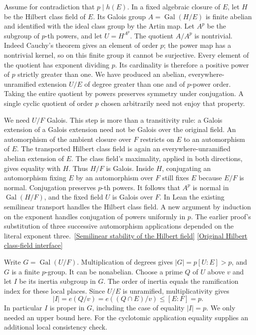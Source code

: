 \documentclass[12pt,letterpaper]{article}
\begin{document}
Assume for contradiction that \(p\mid h(E)\). In a fixed algebraic closure of \(E\), let \(H\) be the Hilbert class field of \(E\). Its Galois group \(A=\operatorname{Gal}(H/E)\) is finite abelian and identified with the ideal class group by the Artin map. Let \(A^p\) be the subgroup of \(p\)-th powers, and let \(U=H^{A^p}\). The quotient \(A/A^p\) is nontrivial. Indeed Cauchy's theorem gives an element of order \(p\); the power map has a nontrivial kernel, so on this finite group it cannot be surjective. Every element of the quotient has exponent dividing \(p\). Its cardinality is therefore a positive power of \(p\) strictly greater than one. We have produced an abelian, everywhere-unramified extension \(U/E\) of degree greater than one and of \(p\)-power order. Taking the entire quotient by powers preserves symmetry under conjugation. A single cyclic quotient of order \(p\) chosen arbitrarily need not enjoy that property.

We need \(U/F\) Galois. This step is more than a transitivity rule: a Galois extension of a Galois extension need not be Galois over the original field. An automorphism of the ambient closure over \(F\) restricts on \(E\) to an automorphism of \(E\). The transported Hilbert class field is again an everywhere-unramified abelian extension of \(E\). The class field's maximality, applied in both directions, gives equality with \(H\). Thus \(H/F\) is Galois. Inside \(H\), conjugating an automorphism fixing \(E\) by an automorphism over \(F\) still fixes \(E\) because \(E/F\) is normal. Conjugation preserves \(p\)-th powers. It follows that \(A^p\) is normal in \(\operatorname{Gal}(H/F)\), and the fixed field \(U\) is Galois over \(F\). In Lean the existing semilinear transport handles the Hilbert class field. A new argument by induction on the exponent handles conjugation of powers uniformly in \(p\). The earlier proof's substitution of three successive automorphism applications depended on the literal exponent three.\
\href{https://github.com/nousentllc/riemann-hypothesis/blob/e674cb750ef96b2f5e7cd46586ea4edb9998715a/research/uriel/experiments/ascent-witness/HilbertNormal.lean}{[Semilinear stability of the Hilbert field]}\quad
\href{https://github.com/nousentllc/riemann-hypothesis/blob/40e56bab026552e089d7afcfeff08d2defb9c005/src/GroundTheory/GlobalFields/ClassFieldConsequences/HilbertClassField.lean}{[Original Hilbert class-field interface]}

Write \(G=\operatorname{Gal}(U/F)\). Multiplication of degrees gives \(|G|=p[U:E]>p\), and \(G\) is a finite \(p\)-group. It can be nonabelian. Choose a prime \(Q\) of \(U\) above \(v\) and let \(I\) be its inertia subgroup in \(G\). The order of inertia equals the ramification index for these local places. Since \(U/E\) is unramified, multiplicativity gives
\[
                 |I|=e(Q/v)=e((Q\cap E)/v)\le [E:F]=p.
\]
In particular \(I\) is proper in \(G\), including the case of equality \(|I|=p\). We only needed an upper bound here. For the cyclotomic application equality supplies an additional local consistency check.
\end{document}
